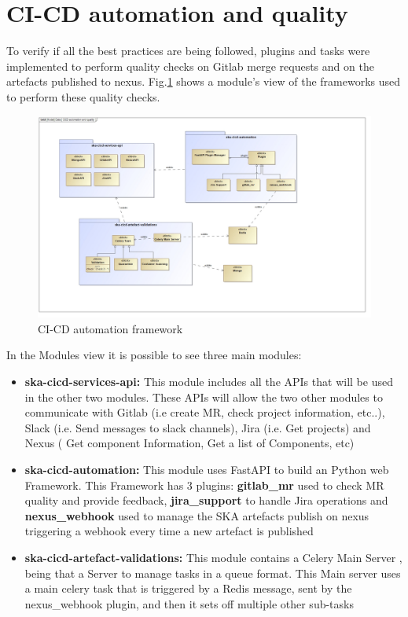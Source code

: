 \documentclass[a4paper,
               keeplastbox,   %
               ]{jacow}
\begin{document}
\section{CI-CD automation and quality}


To verify if all the best practices are being followed, plugins and tasks were implemented to perform quality checks on Gitlab merge requests and on the artefacts published to nexus. Fig.\ref{fig:CICD-automation-quality} shows a module’s view of the frameworks used to perform these quality checks. 

\begin{figure}[!htb]
    \centering
    \includegraphics*[width=0.8\columnwidth]{CICD-automation-quality}
    \caption{CI-CD automation framework}
    \label{fig:CICD-automation-quality}
 \end{figure}
 
 In the Modules view it is possible to see three main modules:
 
 \begin{itemize}
    \item \textbf{ska-cicd-services-api:} This module includes all the APIs that will be used in the other two modules. These APIs will allow the two other modules to communicate with Gitlab (i.e create MR, check project information, etc..), Slack (i.e. Send messages to slack channels), Jira (i.e. Get projects) and Nexus ( Get component Information, Get a list of Components, etc)
    \item \textbf{ska-cicd-automation:} This module uses FastAPI \cite{fastapi} to build an Python web Framework. This Framework has 3 plugins: \textbf{gitlab\_mr} used to check MR quality and provide feedback, \textbf{jira\_support} to handle Jira operations and \textbf{nexus\_webhook} used to manage the SKA artefacts publish on nexus triggering a webhook every time a new artefact is published
    \item \textbf{ska-cicd-artefact-validations:} This module contains a Celery Main Server \cite{celery}, being that a Server to manage tasks in a queue format. This Main server uses a main celery task that is triggered by a Redis message, sent by the nexus\_webhook plugin, and then it sets off multiple other sub-tasks
 \end{itemize}
 
\end{document}
